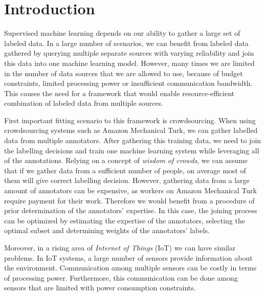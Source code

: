 \documentclass{llncs}
\begin{document}
\section{Introduction}
Supervised machine learning depends on our ability to gather a large set of labeled data. In a large number of scenarios, we can benefit from labeled data gathered by querying multiple separate sources with varying reliability and join this data into one machine learning model. However, many times we are limited in the number of data sources that we are allowed to use, because of budget constraints, limited processing power or insufficient communication bandwidth. This causes the need for a framework that would enable resource-efficient combination of labeled data from multiple sources.

First important fitting scenario to this framework is crowdsourcing. When using crowdsourcing systems such as Amazon Mechanical Turk, we can gather labelled data from multiple annotators. After gathering this training data, we need to join the labelling decisions and train one machine learning system while leveraging all of the annotations. Relying on a concept of \textit{wisdom of crowds}, we can assume that if we gather data from a sufficient number of people, on average most of them will give correct labelling decision. However, gathering data from a large amount of annotators can be expensive, as workers on Amazon Mechanical Turk require payment for their work. Therefore we would benefit from a procedure of prior determination of the annotators' expertise. In this case, the joining process can be optimized by estimating the expertise of the annotators, selecting the optimal subset and determining weights of the annotators' labels. 

Moreover, in a rising area of \textit{Internet of Things} (IoT) we can have similar problems. In IoT systems, a large number of sensors provide information about the environment. Communication among multiple sensors can be costly in terms of processing power. Furthermore, this communication can be done among sensors that are limited with power consumption constraints.
\end{document}
